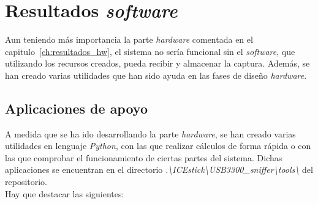 \chapter{Resultados \emph{software}}
\label{ch:resultados_sw}

Aun teniendo más importancia la parte \emph{hardware} comentada en el capitulo~\ref{ch:resultados_hw}, el sistema no sería funcional sin el \emph{software}, que utilizando los recursos creados, pueda recibir y almacenar la captura. Además, se han creado varias utilidades que han sido ayuda en las fases de diseño \emph{hardware}.

\section{Aplicaciones de apoyo}
A medida que se ha ido desarrollando la parte \emph{hardware}, se han creado varias utilidades en lenguaje \emph{Python}, con las que realizar cálculos de forma rápida o con las que comprobar el funcionamiento de ciertas partes del sistema. Dichas aplicaciones se encuentran en el directorio \emph{.\textbackslash ICEstick\textbackslash USB3300\_sniffer\textbackslash tools\textbackslash} del repositorio. \\
Hay que destacar las siguientes:
